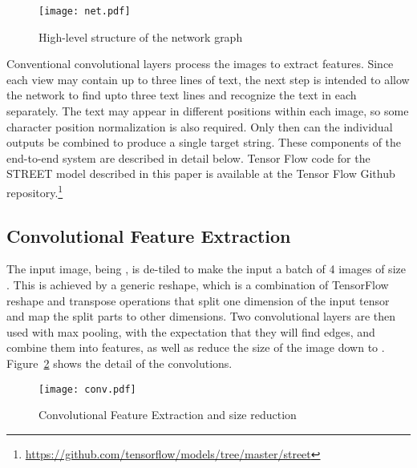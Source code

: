 \documentclass[runningheads]{llncs}
\begin{document}
\begin{figure}
\centering
\vspace{-8cm}
\texttt{[image: net.pdf]}
\caption{High-level structure of the network graph}
\label{fig:net}
\end{figure}

Conventional convolutional layers process the images to extract features. Since each view may contain
 up to three lines of text, the next step is intended to allow the network to find upto three text lines
and recognize the text in each separately.
 The text may appear in different positions within each image, so some character
 position normalization is also required. Only then can the individual outputs be combined to produce
 a single target string. These components of the end-to-end system are described in detail below. 
Tensor Flow code for the STREET model described in this paper is available at the Tensor Flow Github
repository.\footnote{\url{https://github.com/tensorflow/models/tree/master/street}} 

\subsection{Convolutional Feature Extraction}

The input image, being , is de-tiled to make the input a batch of 4 images of size .
 This is achieved by a generic reshape, which is a combination of TensorFlow reshape and transpose
 operations that split one dimension of the input tensor and map the split parts to other dimensions.
 Two convolutional layers are then used with max pooling, with the expectation that they will find edges,
 and combine them into features, as well as reduce the size of the image down to
 . Figure~\ref{fig:conv} shows the detail of the convolutions.

\begin{figure}
\centering
\vspace{-4.5cm}
\texttt{[image: conv.pdf]}
\caption{Convolutional Feature Extraction and size reduction}
\label{fig:conv}
\end{figure}
\end{document}
